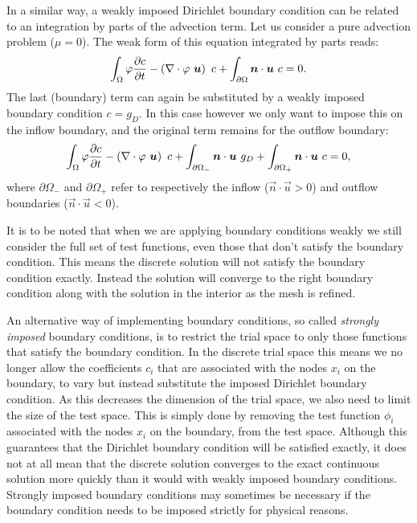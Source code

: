 In a similar way, a weakly imposed Dirichlet boundary condition can be related to an
integration by parts of the advection term. Let us consider a pure advection problem
($\mu=0$). The weak form of this equation integrated by parts reads:
\begin{equation*}
  \int_\Omega \varphi \frac{\partial c}{\partial t} -
    \left(\nabla\cdot \varphi~{\mbox{\boldmath$u$}}\right)~c +
    \int_{\partial\Omega} {\mbox{\boldmath$n$}}\cdot{\mbox{\boldmath$u$}}~c
    = 0.
\end{equation*}
The last (boundary) term can again be substituted by a weakly imposed
boundary condition $c=g_D$.  In this case however we only want to impose
this on the inflow boundary, and the original term remains for the outflow
boundary:
\begin{equation}\label{eq:adv_integrated_by_parts}
  \int_\Omega \varphi \frac{\partial c}{\partial t} -
    \left(\nabla\cdot \varphi~{\mbox{\boldmath$u$}}\right)~c +
    \int_{\partial\Omega_-} {\mbox{\boldmath$n$}}\cdot{\mbox{\boldmath$u$}}~g_D +
    \int_{\partial\Omega_+} {\mbox{\boldmath$n$}}\cdot{\mbox{\boldmath$u$}}~c
    = 0,
\end{equation}
where $\partial\Omega_-$ and $\partial\Omega_+$ refer to respectively
the inflow ($\vec{n}\cdot\vec{u}>0$) and outflow boundaries ($\vec{n}\cdot\vec{u}<0$).

It is to be noted that when we are applying boundary conditions weakly we
still consider the full set of test functions, even those that don't satisfy
the boundary condition. This means the discrete solution will not satisfy
the boundary condition exactly. Instead the solution will converge to the
right boundary condition along with the solution in the interior as the mesh
is refined.

 An alternative way of
implementing boundary conditions, so called \emph{strongly imposed} boundary
conditions, is to restrict the trial space to only those functions that
satisfy the boundary condition. In the discrete trial space this means we no
longer allow the coefficients $c_i$ that are associated with the nodes $x_i$
on the boundary, to vary but instead substitute the imposed Dirichlet
boundary condition. As this decreases the dimension of the trial space, we
also need to limit the size of the test space. This is simply done by
removing the test function $\phi_i$ associated with the nodes $x_i$ on the
boundary, from the test space. Although this guarantees that the Dirichlet
boundary condition will be satisfied exactly, it does not at all mean that
the discrete solution converges to the exact continuous solution more
quickly than it would with weakly imposed boundary conditions. Strongly
imposed boundary conditions may sometimes be necessary if the boundary
condition needs to be imposed strictly for physical reasons.

